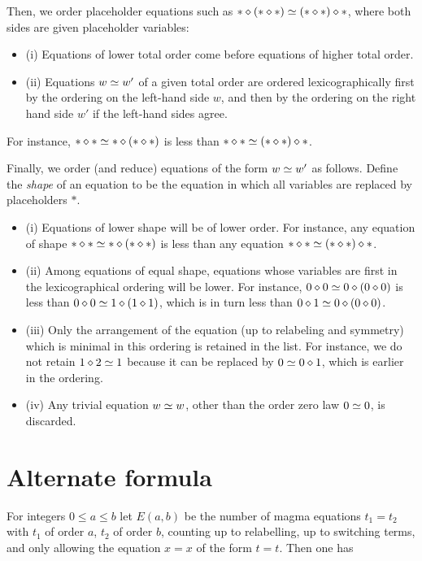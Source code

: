 Then, we order placeholder equations such as $\ast \diamond (\ast \diamond \ast) \simeq (\ast \diamond \ast) \diamond \ast$, where both sides are given placeholder variables:
\begin{itemize}
\item (i)  Equations of lower total order come before equations of higher total order.
\item (ii) Equations $w \simeq w'$ of a given total order are ordered lexicographically first by the ordering on the left-hand side $w$, and then by the ordering on the right hand side $w'$ if the left-hand sides agree.
\end{itemize}
For instance, $\ast \diamond \ast \simeq \ast \diamond (\ast \diamond \ast)$ is less than $\ast \diamond \ast \simeq (\ast \diamond \ast) \diamond \ast$.

Finally, we order (and reduce) equations of the form $w \simeq w'$ as follows. Define the \emph{shape} of an equation to be the equation in which all variables are replaced by placeholders $\ast$.
\begin{itemize}
  \item (i) Equations of lower shape will be of lower order.  For instance, any equation of shape $\ast \diamond \ast \simeq \ast \diamond (\ast \diamond \ast)$ is less than any equation $\ast \diamond \ast \simeq (\ast \diamond \ast) \diamond \ast$.
  \item (ii) Among equations of equal shape, equations whose variables are first in the lexicographical ordering will be lower. For instance, $0 \diamond 0 \simeq 0 \diamond (0 \diamond 0)$ is less than $0 \diamond 0 \simeq 1 \diamond (1 \diamond 1)$, which is in turn less than $0 \diamond 1 \simeq 0 \diamond (0 \diamond 0)$.
  \item (iii) Only the arrangement of the equation (up to relabeling and symmetry) which is minimal in this ordering is retained in the list.  For instance, we do not retain $1 \diamond 2 \simeq 1$ because it can be replaced by $0 \simeq 0 \diamond 1$, which is earlier in the ordering.
\item (iv) Any trivial equation $w \simeq w$, other than the order zero law $0 \simeq 0$, is discarded.
\end{itemize}

\section{Alternate formula}

For integers $0 \le a \le b$ let $E(a,b)$ be the number of magma equations $t_1 = t_2$ with $t_1$ of order $a$, $t_2$ of order $b$, counting up to relabelling, up to switching terms, and only allowing the equation $x=x$ of the form $t=t$.  Then one has


